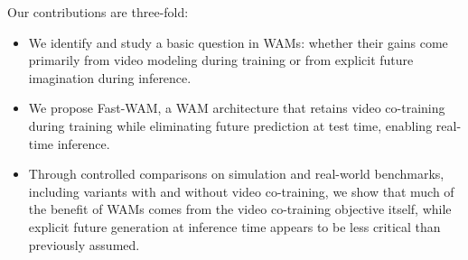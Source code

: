 Our contributions are three-fold:
\begin{itemize}
    \item We identify and study a basic question in WAMs: whether their gains come primarily from video modeling during training or from explicit future imagination during inference.
    \item We propose Fast-WAM, a WAM architecture that retains video co-training during training while eliminating future prediction at test time, enabling real-time inference.
    \item Through controlled comparisons on simulation and real-world benchmarks, including variants with and without video co-training, we show that much of the benefit of WAMs comes from the video co-training objective itself, while explicit future generation at inference time appears to be less critical than previously assumed.
\end{itemize}
